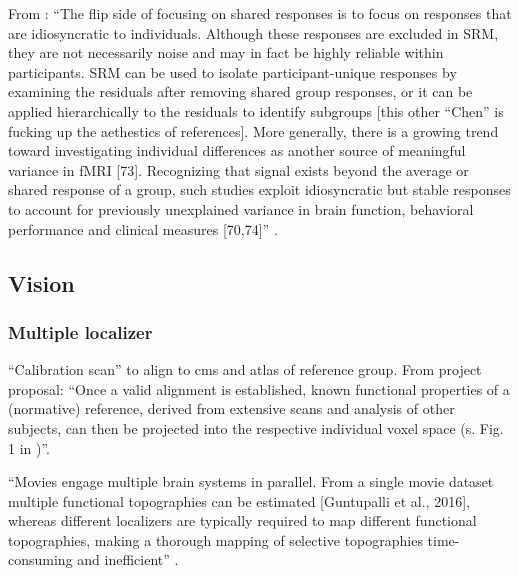 From \citep{cohen2017computational}: ``The flip side of focusing on shared
responses is to focus on responses that are idiosyncratic to individuals.
Although these responses are excluded in SRM, they are not necessarily noise and
may in fact be highly reliable within participants.  SRM can be used to isolate
participant-unique responses by examining the residuals after removing shared
group responses, or it can be applied hierarchically to the residuals to
identify subgroups \citep{chen2017shared} \citep{cohen2017computational} [this
other ``Chen'' is fucking up the aethestics of references].  More generally,
there is a growing trend toward investigating individual differences as another
source of meaningful variance in fMRI [73].  Recognizing that signal exists
beyond the average or shared response of a group, such studies exploit
idiosyncratic but stable responses to account for previously unexplained
variance in brain function, behavioral performance and clinical measures
[70,74]'' \citep{cohen2017computational}.



\subsection{Vision}




\subsubsection{Multiple localizer}

``Calibration scan'' to align to \ac{cms} and atlas of reference group.
%
From project proposal: ``Once a valid alignment is established, known functional
properties of a (normative) reference, derived from extensive scans and analysis
of other subjects, can then be projected into the respective individual voxel
space (s.  Fig. 1 in \citep{nishimoto2016lining})''.

%
``Movies engage multiple brain systems in parallel. From a single movie dataset
multiple functional topographies can be estimated [Guntupalli et al., 2016],
whereas different localizers are typically required to map different functional
topographies, making a thorough mapping of selective topographies time-consuming
and inefficient'' \citep{jiahui2020predicting}.



